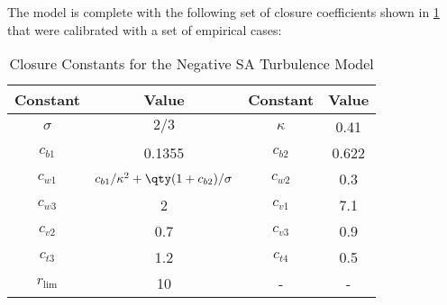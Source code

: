 The model is complete with the following set of closure coefficients shown in \cref{tab:closure_constants} that were calibrated with a set of empirical cases:

\begin{table}[!htbp] \centering 
\begin{tabular}{|c|c|c|c|} \hline
 \bf{Constant} & \bf{Value} & \bf{Constant} & \bf{Value} \\ \hline
 $\sigma$ & $2/3$                                   & $\kappa$ & 0.41 \\ \hline
 $c_{b1}$ & 0.1355                                  & $c_{b2}$ & 0.622 \\ \hline
 $c_{w1}$ & $c_{b1}/\kappa^2+\qty(1+c_{b2})/\sigma$ & $c_{w2}$ & 0.3 \\ \hline
 $c_{w3}$ & 2                                       & $c_{v1}$ & 7.1 \\ \hline
 $c_{v2}$ & 0.7                                     & $c_{v3}$ & 0.9 \\ \hline
 $c_{t3}$ & 1.2                                     & $c_{t4}$ & 0.5 \\ \hline
 $r_{\text{lim}}$ & 10 & - & - \\ \hline
\end{tabular} \caption{Closure Constants for the Negative SA Turbulence Model}
\label{tab:closure_constants}
\end{table}



